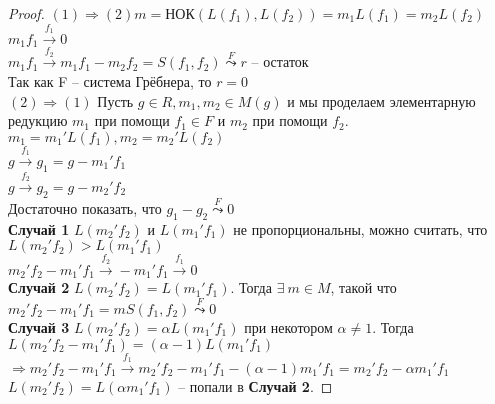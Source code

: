\begin{proof}
    $(1)\Rightarrow (2) m=$НОК$(L(f_1),L(f_2))=m_1L(f_1)=m_2L(f_2)$\\
    $m_1f_1\overset{f_1}{\to}0$\\
    $m_1f_1\overset{f_2}{\to}m_1f_1-m_2f_2=S(f_1,f_2)\overset{F}{\leadsto}r$ -- остаток\\
    Так как F -- система Грёбнера, то $r=0$\\
    $(2)\Rightarrow (1)$ Пусть $g\in R, m_1,m_2\in M(g)$ и мы проделаем элементарную редукцию $m_1$ при помощи $f_1\in F$ и $m_2$ при помощи $f_2$.\\
    $m_1=m_1'L(f_1), m_2=m_2'L(f_2)$\\
    $g\overset{f_1}{\to}g_1=g-m_1'f_1$\\
    $g\overset{f_2}{\to}g_2=g-m_2'f_2$\\
    Достаточно показать, что $g_1-g_2\overset{F}{\leadsto}0$\\
    \textbf{Случай 1} $L(m_2'f_2)$ и $L(m_1'f_1)$ не пропорциональны, можно считать, что $L(m_2'f_2)>L(m_1'f_1)$\\
    $m_2'f_2-m_1'f_1\overset{f_2}{\to}-m_1'f_1\overset{f_1}{\to}0$\\
    \textbf{Случай 2} $L(m_2'f_2)=L(m_1'f_1)$. Тогда $\exists \ m\in M$, такой что $m_2'f_2-m_1'f_1=mS(f_1,f_2)\overset{F}{\leadsto}0$\\
    \textbf{Случай 3} $L(m_2'f_2)=\alpha L(m_1'f_1)$ при некотором $\alpha\neq 1$. Тогда $L(m_2'f_2-m_1'f_1)=(\alpha - 1)L(m_1'f_1)$\\
    $\Rightarrow m_2'f_2-m_1'f_1\overset{f_1}{\to}m_2'f_2-m_1'f_1-(\alpha - 1)m_1'f_1=m_2'f_2-\alpha m_1'f_1$\\
    $L(m_2'f_2)=L(\alpha m_1'f_1)$ -- попали в \textbf{Случай 2}.
\end{proof}